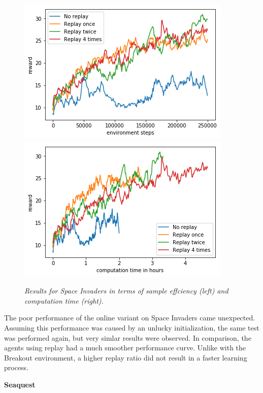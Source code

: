 \begin{figure}[h]
\includegraphics[scale=0.55]{bilder/spaceinvbyonline.png}
\includegraphics[scale=0.55]{bilder/spaceinvbytime.png}
\caption{ \textit{Results for Space Invaders in terms of sample effciency (left) and computation time (right).}}
\end{figure}

The poor performance of the online variant on Space Invaders came unexpected. Assuming this performance was caused by an unlucky initialization, the same test was performed again, but very simlar results were observed. In comparison, the agents using replay had a much smoother performance curve.
Unlike with the Breakout environment, a higher replay ratio did not result in a faster learning process.

\begin{center}
\textbf{Seaquest}

\end{center}

